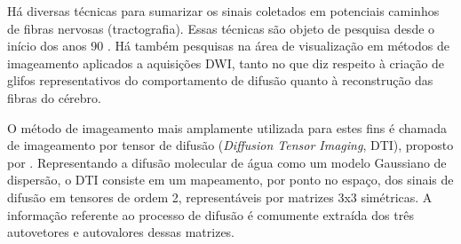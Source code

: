 \documentclass[
    12pt,                %
    oneside,            %
    a4paper,            %
    english,            %
    french,                %
    spanish,            %
    brazil                %
    ]{abntex2}
\begin{document}





Há diversas técnicas para sumarizar os sinais coletados em potenciais caminhos de fibras nervosas (tractografia). Essas técnicas são objeto de pesquisa desde o início dos anos 90 \cite{descoteaux2015}. Há também pesquisas na área de visualização em métodos de imageamento aplicados a aquisições DWI, tanto no que diz respeito à criação de glifos representativos do comportamento de difusão quanto à reconstrução das fibras do cérebro.

O método de imageamento mais amplamente utilizada para estes fins é chamada de imageamento por tensor de difusão (\textit{Diffusion Tensor Imaging}, DTI), proposto por . Representando a difusão molecular de água como um modelo Gaussiano de dispersão, o DTI consiste em um mapeamento, por ponto no espaço, dos sinais de difusão em tensores de ordem 2, representáveis por matrizes 3x3 simétricas. A informação referente ao processo de difusão é comumente extraída dos três autovetores e autovalores dessas matrizes.
\end{document}
